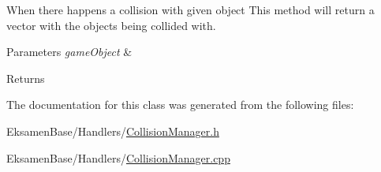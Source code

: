 When there happens a collision with given object This method will return a vector with the objects being collided with. 


\begin{DoxyParams}{Parameters}
{\em game\+Object} & \\
\hline
\end{DoxyParams}
\begin{DoxyReturn}{Returns}

\end{DoxyReturn}


The documentation for this class was generated from the following files\+:\begin{DoxyCompactItemize}
\item 
Eksamen\+Base/\+Handlers/\mbox{\hyperlink{_collision_manager_8h}{Collision\+Manager.\+h}}\item 
Eksamen\+Base/\+Handlers/\mbox{\hyperlink{_collision_manager_8cpp}{Collision\+Manager.\+cpp}}\end{DoxyCompactItemize}
